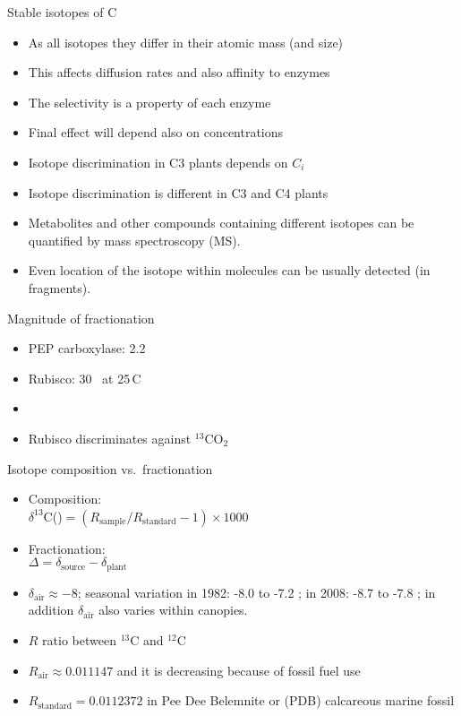 \documentclass[10pt]{beamer}
\begin{document}
\begin{frame}{Stable isotopes of C}
    \begin{itemize}
        \item As all isotopes they differ in their atomic mass (and size)
        \item This affects diffusion rates and also affinity to enzymes
        \item The selectivity is a property of each enzyme
        \item Final effect will depend also on concentrations
        \item Isotope discrimination in C3 plants depends on $C_i$
        \item Isotope discrimination is different in C3 and C4 plants
        \item Metabolites and other compounds containing different isotopes can
        be quantified by mass spectroscopy (MS).
        \item Even location of the isotope within molecules can be usually
        detected (in fragments).
    \end{itemize}
\end{frame}

\begin{frame}{Magnitude of fractionation}
    \begin{itemize}
        \item PEP carboxylase: 2.2 \permil
        \item Rubisco: 30 \permil\ at 25\,C
        \item[]
        \item Rubisco discriminates against $^{13}$CO$_2$
    \end{itemize}
\end{frame}

\begin{frame}{Isotope composition vs.\ fractionation}
    \begin{itemize}
        \item Composition:\\
        $\delta ^{13}$C(\permil)$ = (R_\mathrm{sample}/R_\mathrm{standard} - 1) \times 1000$
        \item Fractionation:\\
        $\Delta = \delta_\mathrm{source} - \delta_\mathrm{plant}$
        \item $\delta_\mathrm{air} \approx -8$\permil; seasonal variation in 1982: -8.0 to -7.2 \permil; in 2008: -8.7 to -7.8 \permil; in addition $\delta_\mathrm{air}$ also varies within canopies.
        \item $R$ ratio between $^{13}$C and $^{12}$C
        \item $R_\mathrm{air} \approx 0.011147$ and it is decreasing because of fossil fuel use
        \item $R_\mathrm{standard} = 0.0112372$ in Pee Dee Belemnite or (PDB) calcareous marine fossil
    \end{itemize}
\end{frame}
\end{document}
